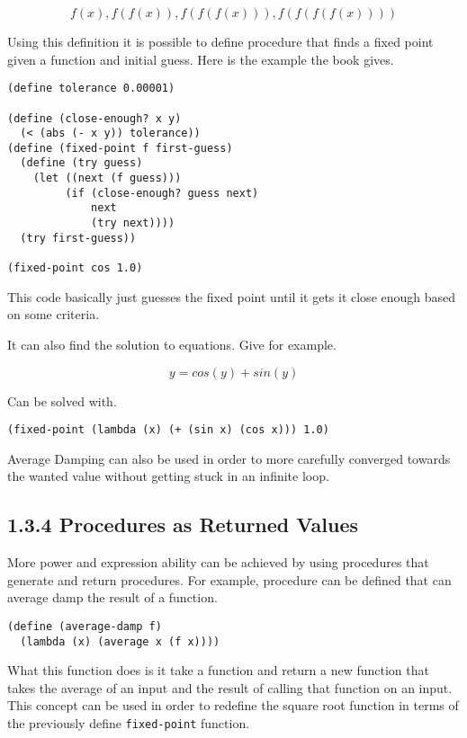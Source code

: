 \documentclass[11pt]{article}
\begin{document}
\begin{equation}
f(x), f(f(x)), f(f(f(x))), f(f(f(f(x))))
\end{equation}

Using this definition it is possible to define procedure that finds a
fixed point given a function and initial guess. Here is the example the
book gives.

\begin{verbatim}
(define tolerance 0.00001)

(define (close-enough? x y)
  (< (abs (- x y)) tolerance))
(define (fixed-point f first-guess)
  (define (try guess)
    (let ((next (f guess)))
         (if (close-enough? guess next)
             next
             (try next))))
  (try first-guess))

(fixed-point cos 1.0)
\end{verbatim}

This code basically just guesses the fixed point until it gets it close
enough based on some criteria.

It can also find the solution to equations. Give for example.

\begin{equation}
y = cos(y) + sin(y)
\end{equation}

Can be solved with.

\begin{verbatim}
(fixed-point (lambda (x) (+ (sin x) (cos x))) 1.0)
\end{verbatim}

Average Damping can also be used in order to more carefully converged
towards the wanted value without getting stuck in an infinite loop.

\subsection{1.3.4 Procedures as Returned Values}
\label{sec:org58486ce}
More power and expression ability can be achieved by using procedures
that generate and return procedures. For example, procedure can be
defined that can average damp the result of a function.

\begin{verbatim}
(define (average-damp f)
  (lambda (x) (average x (f x))))
\end{verbatim}

What this function does is it take a function and return a new function
that takes the average of an input and the result of calling that
function on an input. This concept can be used in order to redefine the
square root function in terms of the previously define \texttt{fixed-point}
function.
\end{document}
